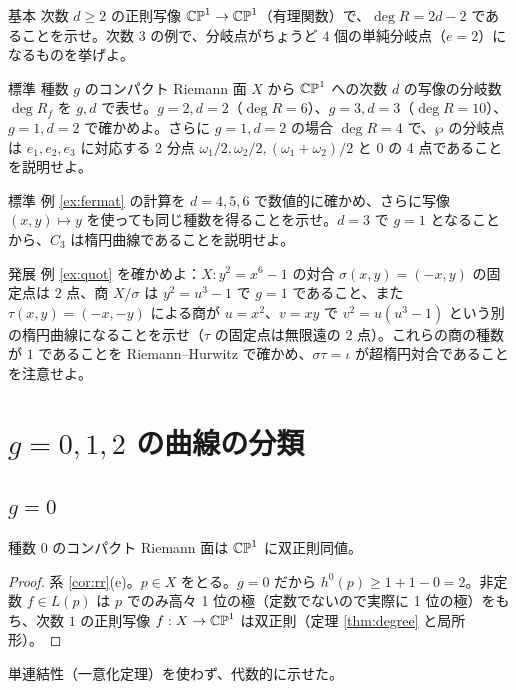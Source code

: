 \begin{prob}{基本}\label{p:RHbasic}
次数 $d\ge2$ の正則写像 $\mathbb{CP}^1\to\mathbb{CP}^1$（有理関数）で、$\deg R=2d-2$ であることを示せ。次数 $3$ の例で、分岐点がちょうど $4$ 個の単純分岐点（$e=2$）になるものを挙げよ。
\end{prob}
\begin{prob}{標準}\label{p:Rcount}
種数 $g$ のコンパクト Riemann 面 $X$ から $\mathbb{CP}^1$ への次数 $d$ の写像の分岐数 $\deg R_f$ を $g,d$ で表せ。$g=2,d=2$（$\deg R=6$）、$g=3,d=3$（$\deg R=10$）、$g=1,d=2$ で確かめよ。さらに $g=1,d=2$ の場合 $\deg R=4$ で、$\wp$ の分岐点は $e_1,e_2,e_3$ に対応する 2 分点 $\omega_1/2,\omega_2/2,(\omega_1+\omega_2)/2$ と $0$ の 4 点であることを説明せよ。
\end{prob}
\begin{prob}{標準}\label{p:fermat}
例 \ref{ex:fermat} の計算を $d=4,5,6$ で数値的に確かめ、さらに写像 $(x,y)\mapsto y$ を使っても同じ種数を得ることを示せ。$d=3$ で $g=1$ となることから、$C_3$ は楕円曲線であることを説明せよ。
\end{prob}
\begin{prob}{発展}\label{p:quotient}
例 \ref{ex:quot} を確かめよ：$X:y^2=x^6-1$ の対合 $\sigma(x,y)=(-x,y)$ の固定点は $2$ 点、商 $X/\sigma$ は $y^2=u^3-1$ で $g=1$ であること、また $\tau(x,y)=(-x,-y)$ による商が $u=x^2$、$v=xy$ で $v^2=u(u^3-1)$ という別の楕円曲線になることを示せ（$\tau$ の固定点は無限遠の $2$ 点）。これらの商の種数が $1$ であることを Riemann--Hurwitz で確かめ、$\sigma\tau=\iota$ が超楕円対合であることを注意せよ。
\end{prob}

\section{$g=0,1,2$ の曲線の分類}\label{sec:g012}

\subsection{$g=0$}
\begin{thm}\label{thm:g0}
種数 $0$ のコンパクト Riemann 面は $\mathbb{CP}^1$ に双正則同値。
\end{thm}
\begin{proof}
系 \ref{cor:rr}(e)。$p\in X$ をとる。$g=0$ だから $h^0(p)\ge1+1-0=2$。非定数 $f\in L(p)$ は $p$ でのみ高々 1 位の極（定数でないので実際に 1 位の極）をもち、次数 $1$ の正則写像 $f:X\to\mathbb{CP}^1$ は双正則（定理 \ref{thm:degree} と局所形）。
\end{proof}
単連結性（一意化定理）を使わず、代数的に示せた。

